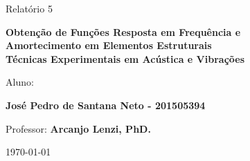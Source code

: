 {\begin{capa}
\begin{figure}[!ht]
\begin{minipage}[c]{0.78\textwidth}
\begin{minipage}[t]{1\linewidth}
		\vspace{2cm}
		\Huge Relatório 5
		
	
		\vspace{1cm}
		 \textbf{Obtenção de Funções Resposta em Frequência e Amortecimento em Elementos Estruturais \\
		 	\Large{Técnicas Experimentais em Acústica e Vibrações}}
		
		\vspace{6cm}
		
		\large
		Aluno:
		
		\textbf{José Pedro de Santana Neto - 201505394}\\
		
		\vspace{6cm}
		
		
		\large
		Professor:
		\textbf{Arcanjo Lenzi, PhD.}
		
		
		\vspace{3cm}
		\vfill
		
		\today 
  \end{minipage}
\end{minipage}
\end{figure}	
	
\end{capa}

\restoregeometry








}
